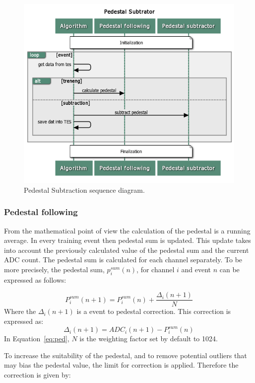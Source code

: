 \begin{figure}
\centering
\includegraphics[scale=0.6]{figures/Pedestal_Subtrator.png}
\caption{Pedestal Subtraction sequence diagram.}
\label{fig:ped}
\end{figure}

\subsubsection{Pedestal following}
From the mathematical point of view the calculation of the pedestal is a running average. In every training event then pedestal sum is updated. This update takes into account the previously calculated value of the pedestal sum and the current ADC count. The pedestal sum is calculated for each channel separately. To be more precisely, the pedestal sum, $p^{sum}_i(n)$, for channel $i$ and event $n$ can be expressed as follows:

\begin{equation}
P_{i}^{sum}(n+1)=P^{sum}_{i}(n) + \frac{\Delta_{i}(n+1)}{N}
\label{eq:ped}
\end{equation}
Where the $\Delta_{i}(n+1)$ is a event to pedestal correction. This correction is expressed as:
\begin{equation}
\Delta_{i}(n+1)=ADC_{i}(n+1)-P^{sum}_{i}(n)
\end{equation}
In Equation~\ref{eq:ped}, $N$ is the weighting factor set by default to 1024. 


To increase the suitability of the pedestal, and to remove potential outliers that may bias the pedestal value, the limit for correction is applied. Therefore the correction is given by:

